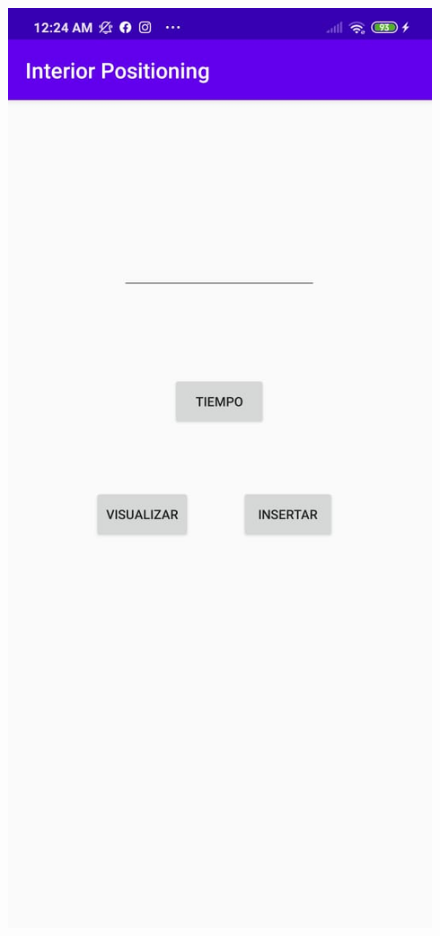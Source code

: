 \documentclass[conference,compsoc,onecolumn]{IEEEtran}
\begin{document}
\begin{figure}[H]
    \centering
    \includegraphics[scale=0.5]{bib/4.PNG}
    \label{fig:1}
\end{figure}
\end{document}
